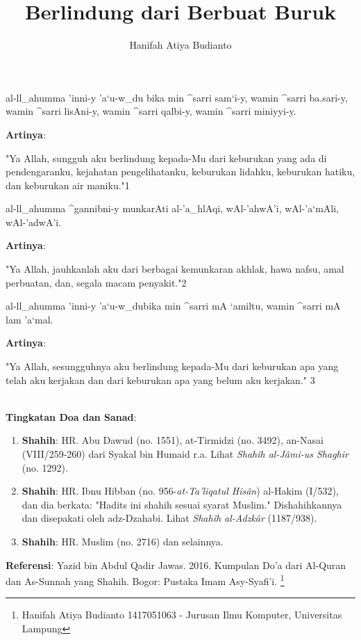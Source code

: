 \documentclass[a4paper,12pt]{article}
\title{\Large Berlindung dari Berbuat Buruk}
\author{\calligra Hanifah Atiya Budianto}
\begin{document}
\sffamily
\maketitle 
\fullvocalize
{}
\begin{arabtext}
\noindent
al-ll_ahumma 'inni-y 'a`u-w_du bika min ^sarri sam`i-y, wamin ^sarri 
ba.sari-y, wamin ^sarri lisAni-y, wamin ^sarri qalbi-y, wamin ^sarri 
miniyyi-y.\\
\end{arabtext}
\noindent
\textbf{Artinya}:
\par
\indent
"Ya Allah, sungguh aku berlindung kepada-Mu dari keburukan yang ada di 
pendengaranku, kejahatan pengelihatanku, keburukan lidahku, keburukan 
hatiku, dan keburukan air maniku."{\scriptsize 1}\\
\begin{arabtext}
\noindent
al-ll_ahumma ^gannibni-y munkarAti al-'a_hlAqi, wAl-'ahwA'i, wAl-'a`mAli, 
wAl-'adwA'i.\\
\end{arabtext}
\noindent
\textbf{Artinya}:
\par
\indent
"Ya Allah, jauhkanlah aku dari berbagai kemunkaran akhlak, hawa nafsu, amal 
perbuatan, dan, segala macam penyakit."{\scriptsize 2}\\
\begin{arabtext}
\noindent
al-ll_ahumma 'inni-y 'a`u-w_dubika min ^sarri mA `amiltu, wamin ^sarri mA 
lam 'a`mal.\\
\end{arabtext}
\noindent
\textbf{Artinya}:
\par
\indent
"Ya Allah, sesungguhnya aku berlindung kepada-Mu dari keburukan apa yang 
telah aku kerjakan dan dari keburukan apa yang belum aku kerjakan."
{\scriptsize 3}\\\\
\par
\noindent
\textbf{Tingkatan Doa dan Sanad}:
\begin{enumerate}
\item \textbf{Shahih}: HR. Abu Dawud (no. 1551), at-Tirmidzi (no. 3492), 
an-Nasai (VIII/259-260) dari Syakal bin Humaid r.a. Lihat 
\textit{Shah\^{i}h al-J\^{a}mi-us Shaghir} (no. 1292).
\item \textbf{Shahih}: HR. Ibnu Hibban (no. 956-\textit{at-Ta'liqatul 
His\^{a}n}) al-Hakim (I/532), dan dia berkata: "Hadits ini shahih sesuai 
syarat Muslim." Dishahihkannya dan disepakati oleh adz-Dzahabi. Lihat 
\textit{Shah\^{i}h al-Adzk\^{a}r} (1187/938).
\item \textbf{Shahih}: HR. Muslim (no. 2716) dan selainnya.
\end{enumerate}
\textbf{Referensi}: Yazid bin Abdul Qadir Jawas. 2016. Kumpulan Do'a dari
Al-Quran dan As-Sunnah yang Shahih. Bogor: Pustaka Imam Asy-Syafi'i.
\footnote{Hanifah Atiya Budianto 1417051063 - Jurusan Ilmu Komputer,
Universitas Lampung}
\end{document}
